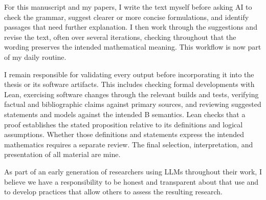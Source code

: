 For this manuscript and my papers, I write the text myself before asking AI
to check the grammar, suggest clearer or more concise formulations, and
identify passages that need further explanation. I then work through the
suggestions and revise the text, often over several iterations, checking
throughout that the wording preserves the intended mathematical meaning.
This workflow is now part of my daily routine.

I remain responsible for validating every output before incorporating it into
the thesis or its software artifacts. This includes checking formal developments
with Lean, exercising software changes through the relevant builds and tests,
verifying factual and bibliographic claims against primary sources, and
reviewing suggested statements and models against the intended B semantics.
Lean checks that a proof establishes the stated proposition relative to its
definitions and logical assumptions. Whether those definitions and statements
express the intended mathematics requires a separate review. The final
selection, interpretation, and presentation of all material are mine.

As part of an early generation of researchers using LLMs throughout their
work, I believe we have a responsibility to be honest and transparent about
that use and to develop practices that allow others to assess the resulting
research.
